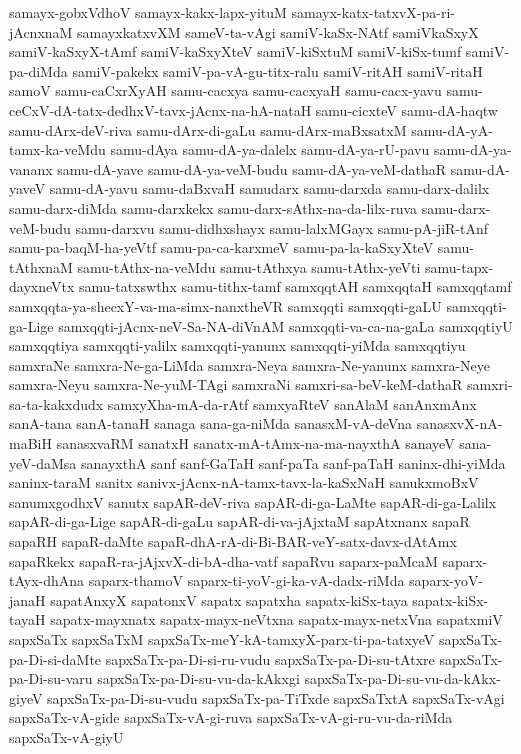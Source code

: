{samayx-gobxVdhoV
samayx-kakx-lapx-yituM
samayx-katx-tatxvX-pa-ri-jAcnxnaM
samayxkatxvXM
sameV-ta-vAgi
samiV-kaSx-NAtf
samiVkaSxyX
samiV-kaSxyX-tAmf
samiV-kaSxyXteV
samiV-kiSxtuM
samiV-kiSx-tumf
samiV-pa-diMda
samiV-pakekx
samiV-pa-vA-gu-titx-ralu
samiV-ritAH
samiV-ritaH
samoV
samu-caCxrXyAH
samu-cacxya
samu-cacxyaH
samu-cacx-yavu
samu-ceCxV-dA-tatx-dedhxV-tavx-jAcnx-na-hA-nataH
samu-cicxteV
samu-dA-haqtw
samu-dArx-deV-riva
samu-dArx-di-gaLu
samu-dArx-maBxsatxM
samu-dA-yA-tamx-ka-veMdu
samu-dAya
samu-dA-ya-dalelx
samu-dA-ya-rU-pavu
samu-dA-ya-vananx
samu-dA-yave
samu-dA-ya-veM-budu
samu-dA-ya-veM-dathaR
samu-dA-yaveV
samu-dA-yavu
samu-daBxvaH
samudarx
samu-darxda
samu-darx-dalilx
samu-darx-diMda
samu-darxkekx
samu-darx-sAthx-na-da-lilx-ruva
samu-darx-veM-budu
samu-darxvu
samu-didhxshayx
samu-lalxMGayx
samu-pA-jiR-tAnf
samu-pa-baqM-ha-yeVtf
samu-pa-ca-karxmeV
samu-pa-la-kaSxyXteV
samu-tAthxnaM
samu-tAthx-na-veMdu
samu-tAthxya
samu-tAthx-yeVti
samu-tapx-dayxneVtx
samu-tatxswthx
samu-tithx-tamf
samxqqtAH
samxqqtaH
samxqqtamf
samxqqta-ya-shecxY-va-ma-simx-nanxtheVR
samxqqti
samxqqti-gaLU
samxqqti-ga-Lige
samxqqti-jAcnx-neV-Sa-NA-diVnAM
samxqqti-va-ca-na-gaLa
samxqqtiyU
samxqqtiya
samxqqti-yalilx
samxqqti-yanunx
samxqqti-yiMda
samxqqtiyu
samxraNe
samxra-Ne-ga-LiMda
samxra-Neya
samxra-Ne-yanunx
samxra-Neye
samxra-Neyu
samxra-Ne-yuM-TAgi
samxraNi
samxri-sa-beV-keM-dathaR
samxri-sa-ta-kakxdudx
samxyXha-mA-da-rAtf
samxyaRteV
sanAlaM
sanAnxmAnx
sanA-tana
sanA-tanaH
sanaga
sana-ga-niMda
sanasxM-vA-deVna
sanasxvX-nA-maBiH
sanasxvaRM
sanatxH
sanatx-mA-tAmx-na-ma-nayxthA
sanayeV
sana-yeV-daMsa
sanayxthA
sanf
sanf-GaTaH
sanf-paTa
sanf-paTaH
saninx-dhi-yiMda
saninx-taraM
sanitx
sanivx-jAcnx-nA-tamx-tavx-la-kaSxNaH
sanukxmoBxV
sanumxgodhxV
sanutx
sapAR-deV-riva
sapAR-di-ga-LaMte
sapAR-di-ga-Lalilx
sapAR-di-ga-Lige
sapAR-di-gaLu
sapAR-di-va-jAjxtaM
sapAtxnanx
sapaR
sapaRH
sapaR-daMte
sapaR-dhA-rA-di-Bi-BAR-veY-satx-davx-dAtAmx
sapaRkekx
sapaR-ra-jAjxvX-di-bA-dha-vatf
sapaRvu
saparx-paMcaM
saparx-tAyx-dhAna
saparx-thamoV
saparx-ti-yoV-gi-ka-vA-dadx-riMda
saparx-yoV-janaH
sapatAnxyX
sapatonxV
sapatx
sapatxha
sapatx-kiSx-taya
sapatx-kiSx-tayaH
sapatx-mayxnatx
sapatx-mayx-neVtxna
sapatx-mayx-netxVna
sapatxmiV
sapxSaTx
sapxSaTxM
sapxSaTx-meY-kA-tamxyX-parx-ti-pa-tatxyeV
sapxSaTx-pa-Di-si-daMte
sapxSaTx-pa-Di-si-ru-vudu
sapxSaTx-pa-Di-su-tAtxre
sapxSaTx-pa-Di-su-varu
sapxSaTx-pa-Di-su-vu-da-kAkxgi
sapxSaTx-pa-Di-su-vu-da-kAkx-giyeV
sapxSaTx-pa-Di-su-vudu
sapxSaTx-pa-TiTxde
sapxSaTxtA
sapxSaTx-vAgi
sapxSaTx-vA-gide
sapxSaTx-vA-gi-ruva
sapxSaTx-vA-gi-ru-vu-da-riMda
sapxSaTx-vA-giyU
}
